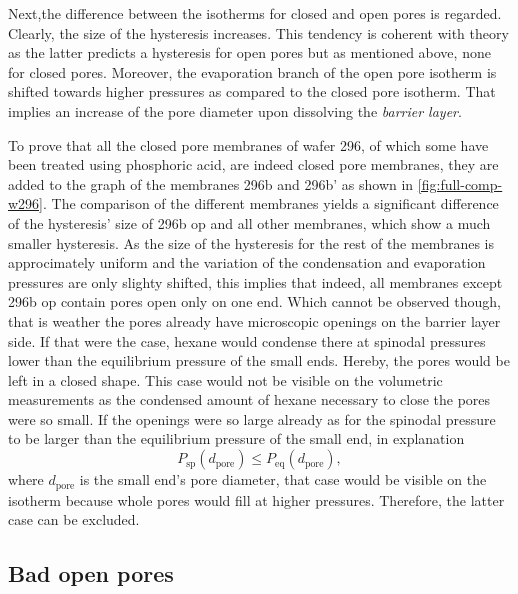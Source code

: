 \documentclass[../thesis.tex]{subfiles}
\begin{document}
        Next,the difference between the isotherms for closed and open pores is regarded. Clearly, the size of the hysteresis increases. This tendency is coherent with theory as the latter predicts a hysteresis for open pores but as mentioned above, none for closed pores. Moreover, the evaporation branch of the open pore isotherm is shifted towards higher pressures as compared to the closed pore isotherm. That implies an increase of the pore diameter upon dissolving the \textit{barrier layer}.
        \medskip

        To prove that all the closed pore membranes of wafer 296, of which some have been treated using phosphoric acid, are indeed closed pore membranes, they are added to the graph of the membranes 296b and 296b' as shown in \cref{fig:full-comp-w296}. The comparison of the different membranes yields a significant difference of the hysteresis' size of 296b op and all other membranes, which show a much smaller hysteresis. As the size of the hysteresis for the rest of the membranes is approcimately uniform and the variation of the condensation and evaporation pressures are only slighty shifted, this implies that indeed, all membranes except 296b op contain pores open only on one end. Which cannot be observed though, that is weather the pores already have microscopic openings on the barrier layer side. If that were the case, hexane would condense there at spinodal pressures lower than the equilibrium pressure of the small ends. Hereby, the pores would be left in a closed shape. This case would not be visible on the volumetric measurements as the condensed amount of hexane necessary to close the pores were so small. If the openings were so large already as for the spinodal pressure to be larger than the equilibrium pressure of the small end, in explanation
        \begin{equation}
          P_\mathrm{sp}(d_\mathrm{pore})\le P_\mathrm{eq}(d_\mathrm{pore}),
        \end{equation}
        where $d_\mathrm{pore}$ is the small end's pore diameter, that case would be visible on the isotherm because whole pores would fill at higher pressures. Therefore, the latter case can be excluded.

        


        \subsection{Bad open pores}
\end{document}
